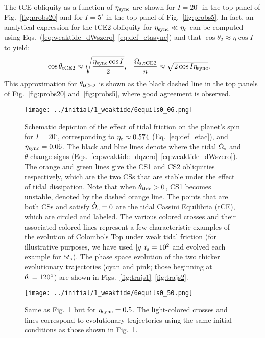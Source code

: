 \documentclass[
        fleqn,
        usenatbib,
    ]{mnras}
\newcommand*{\abs}[1]{\left|#1\right|}
\begin{document}
The tCE obliquity as a function of $\eta_{\rm sync}$ are shown for $I =
20^\circ$ in the top panel of Fig.~\ref{fig:probs20} and for $I = 5^\circ$ in
the top panel of Fig.~\ref{fig:probs5}. In fact, an analytical expression for
the tCE2 obliquity for $\eta_{\rm sync} \ll \eta_{\rm c}$ can be computed using
Eqs.~(\ref{eq:weaktide_dWszero}--\ref{eq:def_etasync}) and that $\cos \theta_2
\approx \eta \cos I$ to yield:
\begin{align}
    \cos \theta_{\rm tCE2} &\approx \sqrt{\frac{\eta_{\rm sync} \cos I}{2}},
        &
    \frac{\Omega_{\rm s, tCE2}}{n} &\approx
        \sqrt{2\cos I \eta_{\rm sync}}. \label{eq:def_tce2_approx}
\end{align}
This approximation for $\theta_{\rm tCE2}$ is shown as the black dashed line in
the top panels of Fig.~\ref{fig:probs20} and~\ref{fig:probs5}, where good
agreement is observed.
\begin{figure*}
    \centering
    \texttt{[image: ../initial/1\_weaktide/6equils0\_06.png]}
    \caption{Schematic depiction of the effect of tidal friction on the planet's
    spin for $I = 20^\circ$, corresponding to $\eta_{\rm c} \approx 0.574$
    (Eq.~\ref{eq:def_etac}), and $\eta_{\rm sync} = 0.06$. The black and blue
    lines denote where the tidal $\dot{\Omega}_{\rm s}$ and $\dot{\theta}$
    change signs (Eqs.~\ref{eq:weaktide_dqzero}--\ref{eq:weaktide_dWszero}). The
    orange and green lines give the CS1 and CS2 obliquities respectively, which
    are the two CSs that are stable under the effect of tidal dissipation. Note
    that when $\dot{\theta}_{\rm tide} > 0$, CS1 becomes unstable, denoted by
    the dashed orange line. The points that are both CSs and satisfy
    $\dot{\Omega}_{\rm s} = 0$ are the tidal Cassini Equilibria (tCE), which are
    circled and labeled. The various colored crosses and their associated
    colored lines represent a few characteristic examples of the evolution of
    Colombo's Top under weak tidal friction (for illustrative purposes, we have
    used $\abs{g}t_{\rm s} = 10^2$ and evolved each example for $5t_{\rm s}$).
    The phase space evolution of the two thicker evolutionary trajectories (cyan
    and pink; those beginning at $\theta_{\rm i} = 120^\circ$) are shown in
    Figs.~\ref{fig:trajs1}--\ref{fig:trajs2}.
    }\label{fig:6equils006}
\end{figure*}
\begin{figure*}
    \centering
    \texttt{[image: ../initial/1\_weaktide/6equils0\_50.png]}
    \caption{Same as Fig.~\ref{fig:6equils006} but for $\eta_{\rm sync} = 0.5$.
    The light-colored crosses and lines correspond to evolutionary trajectories
    using the same initial conditions as those shown in
    Fig.~\ref{fig:6equils006}.}\label{fig:6equils050}
\end{figure*}
\end{document}
